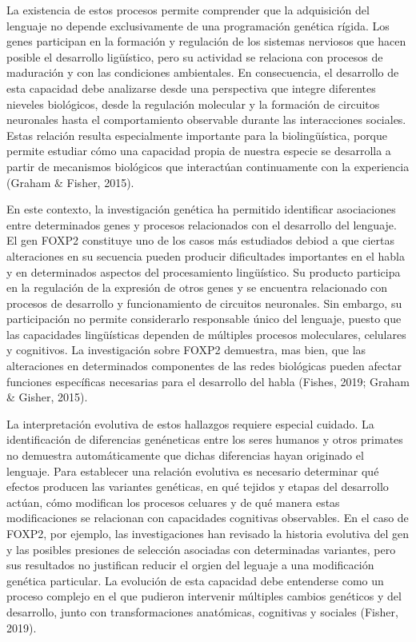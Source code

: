 \documentclass[12pt]{article}
\begin{document}
La existencia de estos procesos permite comprender que la adquisición del lenguaje no depende exclusivamente de una programación genética rígida. Los genes participan en la formación y regulación de los sistemas nerviosos que hacen posible el desarrollo ligüístico, pero su actividad se relaciona con procesos de maduración y con las condiciones ambientales.  En consecuencia, el desarrollo de esta capacidad debe analizarse desde una perspectiva que integre diferentes nieveles biológicos, desde la regulación molecular y la formación de circuitos neuronales hasta el comportamiento observable durante las interacciones sociales. Estas relación resulta especialmente importante para la biolingüística, porque permite estudiar cómo una capacidad propia de nuestra especie se desarrolla a partir de mecanismos biológicos que interactúan continuamente con la experiencia (Graham \& Fisher, 2015).

En este contexto, la investigación genética ha permitido identificar asociaciones entre determinados genes y procesos relacionados con el desarrollo del lenguaje. El gen FOXP2 constituye uno de los casos más estudiados debiod a que ciertas alteraciones en su secuencia pueden producir dificultades importantes en el habla y en determinados aspectos del procesamiento lingüístico. Su producto participa en la regulación de la expresión de otros genes y se encuentra relacionado con procesos de desarrollo y funcionamiento de circuitos neuronales. Sin embargo, su participación no permite considerarlo responsable único del lenguaje, puesto que las capacidades lingüísticas dependen de múltiples procesos moleculares, celulares y cognitivos. La investigación sobre FOXP2 demuestra, mas bien, que las alteraciones en determinados componentes de las redes biológicas pueden afectar funciones específicas necesarias para el desarrollo del habla (Fishes, 2019; Graham \& Gisher, 2015).

La interpretación evolutiva de estos hallazgos requiere especial cuidado. La identificación de diferencias genéneticas entre los seres humanos y otros primates no demuestra automáticamente que dichas diferencias hayan originado el lenguaje. Para establecer una relación evolutiva es necesario determinar qué efectos producen las variantes genéticas, en qué tejidos y etapas del desarrollo actúan, cómo modifican los procesos celuares y de qué manera estas modificaciones se relacionan con capacidades cognitivas observables. En el caso de FOXP2, por ejemplo, las investigaciones han revisado la historia evolutiva del gen y las posibles presiones de selección asociadas con determinadas variantes, pero sus resultados no justifican reducir el orgien del leguaje a una modificación genética particular. La evolución de esta capacidad debe entenderse como un proceso complejo en el que pudieron intervenir múltiples cambios genéticos y del desarrollo, junto con transformaciones anatómicas, cognitivas y sociales (Fisher, 2019).
\end{document}
